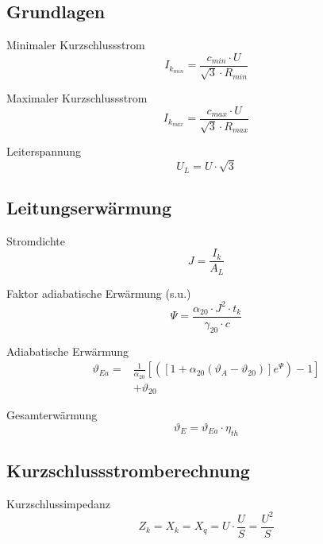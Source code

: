 \documentclass[11pt, a4paper, final, fleqn, twocolumn]{article}
\numberwithin{equation}{subsection}
\begin{document}
\subsection{Grundlagen}

Minimaler Kurzschlussstrom
\begin{equation}
    I_{k_{min}} = \frac{c_{min} \cdot U}{\sqrt{3} \cdot R_{min}}
\end{equation}

\noindent Maximaler Kurzschlussstrom
\begin{equation}
    I_{k_{max}} = \frac{c_{max} \cdot U}{\sqrt{3} \cdot R_{max}}
\end{equation}

\noindent Leiterspannung
\begin{equation}
    U_L = U \cdot \sqrt{3}
\end{equation}


\subsection{Leitungserwärmung}

Stromdichte
\begin{equation}
    J = \frac{I_k}{A_L}
\end{equation}

\noindent Faktor adiabatische Erwärmung (s.u.)
\begin{equation}
    \Psi = \frac{\alpha_{20} \cdot J^2 \cdot t_k}{\gamma_{20} \cdot c}
\end{equation}

\noindent Adiabatische Erwärmung
\begin{equation}
\begin{split}
\vartheta_{Ea} = & \frac{1}{\alpha_{20}} \left[ \left( \left[ 1 + \alpha_{20}(\vartheta_{A} - \vartheta_{20}) \right] e^{\Psi} \right) -1 \right] \\
& + \vartheta_{20}
\end{split}
\end{equation}

\noindent Gesamterwärmung
\begin{equation}
    \vartheta_{E} = \vartheta_{Ea} \cdot \eta_{th}
\end{equation}


\subsection{Kurzschlussstromberechnung}

Kurzschlussimpedanz
\begin{equation}
    Z_k = X_k = X_q = U \cdot \frac{U}{S} = \frac{U^2 }{S}
\end{equation}
\end{document}
